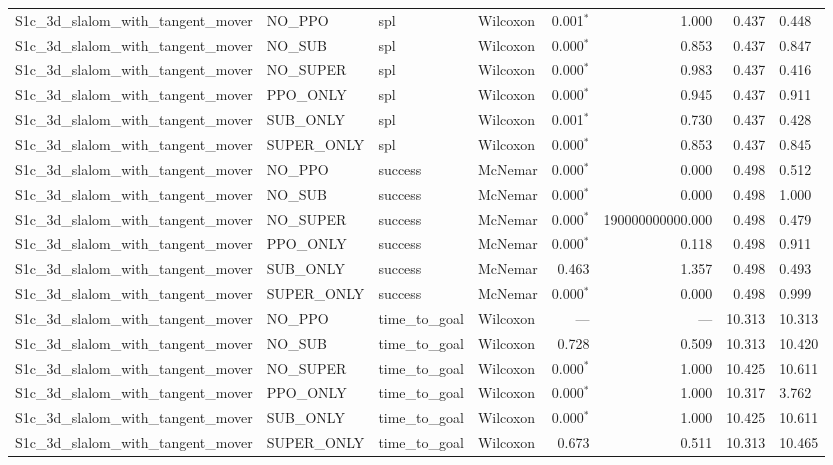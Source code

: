 \begin{tabular}{llllrrrl}
  S1c_3d_slalom_with_tangent_mover & NO_PPO & spl & Wilcoxon & 0.001$^{*}$ & 1.000 & 0.437 & 0.448 \\
  S1c_3d_slalom_with_tangent_mover & NO_SUB & spl & Wilcoxon & 0.000$^{*}$ & 0.853 & 0.437 & 0.847 \\
  S1c_3d_slalom_with_tangent_mover & NO_SUPER & spl & Wilcoxon & 0.000$^{*}$ & 0.983 & 0.437 & 0.416 \\
  S1c_3d_slalom_with_tangent_mover & PPO_ONLY & spl & Wilcoxon & 0.000$^{*}$ & 0.945 & 0.437 & 0.911 \\
  S1c_3d_slalom_with_tangent_mover & SUB_ONLY & spl & Wilcoxon & 0.001$^{*}$ & 0.730 & 0.437 & 0.428 \\
  S1c_3d_slalom_with_tangent_mover & SUPER_ONLY & spl & Wilcoxon & 0.000$^{*}$ & 0.853 & 0.437 & 0.845 \\
  S1c_3d_slalom_with_tangent_mover & NO_PPO & success & McNemar & 0.000$^{*}$ & 0.000 & 0.498 & 0.512 \\
  S1c_3d_slalom_with_tangent_mover & NO_SUB & success & McNemar & 0.000$^{*}$ & 0.000 & 0.498 & 1.000 \\
  S1c_3d_slalom_with_tangent_mover & NO_SUPER & success & McNemar & 0.000$^{*}$ & 190000000000.000 & 0.498 & 0.479 \\
  S1c_3d_slalom_with_tangent_mover & PPO_ONLY & success & McNemar & 0.000$^{*}$ & 0.118 & 0.498 & 0.911 \\
  S1c_3d_slalom_with_tangent_mover & SUB_ONLY & success & McNemar & 0.463 & 1.357 & 0.498 & 0.493 \\
  S1c_3d_slalom_with_tangent_mover & SUPER_ONLY & success & McNemar & 0.000$^{*}$ & 0.000 & 0.498 & 0.999 \\
  S1c_3d_slalom_with_tangent_mover & NO_PPO & time_to_goal & Wilcoxon & --- & --- & 10.313 & 10.313 \\
  S1c_3d_slalom_with_tangent_mover & NO_SUB & time_to_goal & Wilcoxon & 0.728 & 0.509 & 10.313 & 10.420 \\
  S1c_3d_slalom_with_tangent_mover & NO_SUPER & time_to_goal & Wilcoxon & 0.000$^{*}$ & 1.000 & 10.425 & 10.611 \\
  S1c_3d_slalom_with_tangent_mover & PPO_ONLY & time_to_goal & Wilcoxon & 0.000$^{*}$ & 1.000 & 10.317 & 3.762 \\
  S1c_3d_slalom_with_tangent_mover & SUB_ONLY & time_to_goal & Wilcoxon & 0.000$^{*}$ & 1.000 & 10.425 & 10.611 \\
  S1c_3d_slalom_with_tangent_mover & SUPER_ONLY & time_to_goal & Wilcoxon & 0.673 & 0.511 & 10.313 & 10.465 \\

\end{tabular}
